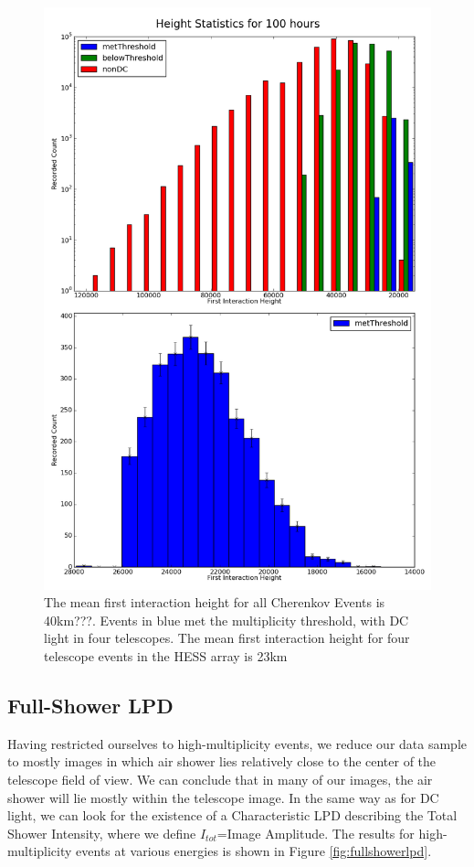 \documentclass[11pt]{article}
\begin{document}
\begin{figure}
\begin{center}
\includegraphics[height=0.9\textheight]{hessheight}
\caption{The mean first interaction height for all Cherenkov Events is 40km???. Events in blue met the multiplicity threshold, with DC light in four telescopes. The mean first interaction height for four telescope events in the HESS array is 23km}
\label{fig:Hessheight}
\end{center}
\end{figure}

\subsection{Full-Shower LPD}
Having restricted ourselves to high-multiplicity events, we reduce our data sample to mostly images in which air shower lies relatively close to the center of the telescope field of view. We can conclude that in many of our images, the air shower will lie mostly within the telescope image. In the same way as for DC light, we can look for the existence of a Characteristic LPD describing the Total Shower Intensity, where we define $I_{tot}$=Image Amplitude. The results for high-multiplicity events at various energies is shown in Figure \ref{fig:fullshowerlpd}.
\end{document}

